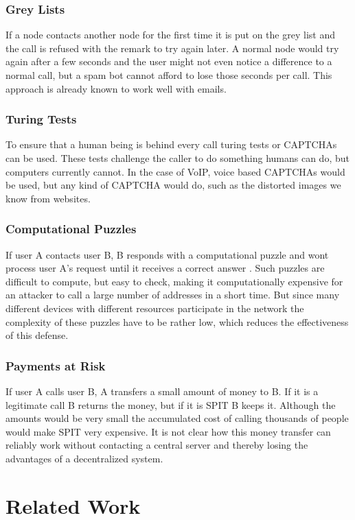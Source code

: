 \documentclass[a4paper,conference]{IEEEtran}
\begin{document}
\subsubsection{Grey Lists}
If a node contacts another node for the first time it is put on the grey list
and the call is refused with the remark to try again later.
A normal node would try again after a few seconds and the user might not even
notice a difference to a normal call, but a spam bot cannot afford to lose those
seconds per call.
This approach is already known to work well with emails.

\subsubsection{Turing Tests}
To ensure that a human being is behind every call turing tests or CAPTCHAs can
be used. These tests challenge the caller to do something
humans can do, but computers currently cannot. In the case of VoIP, voice based
CAPTCHAs would be used, but any kind
of CAPTCHA would do, such as the distorted images we know from websites.

\subsubsection{Computational Puzzles}
If user A contacts user B, B responds with a computational puzzle and wont
process user A's request until it receives a correct answer \cite{touceda}. Such
puzzles
are difficult to compute, but easy to check, making it computationally expensive
for an attacker to call a large number of addresses in a short time.
But since many different devices with different resources participate in the
network the complexity of these puzzles have to be rather low, which
reduces the effectiveness of this defense.

\subsubsection{Payments at Risk}
If user A calls user B, A transfers a small amount of money to B. If it is a
legitimate call B returns the money, but if it is SPIT B keeps it. Although
the amounts would be very small the accumulated cost of calling thousands of
people would make SPIT very expensive. It is not clear how this money transfer
can reliably work without contacting a central server and thereby losing the
advantages of a decentralized system.


\section{Related Work}
\label{relatedwork}
\end{document}
